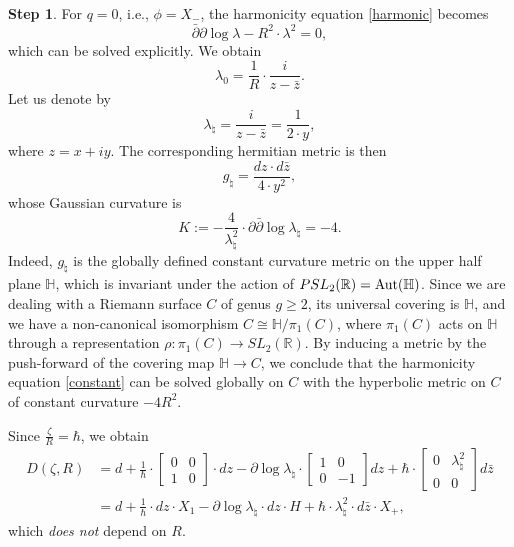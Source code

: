 \documentclass[oneside, 11pt]{amsart}
\theoremstyle{definition}
\newtheorem{step}{Step}
\numberwithin{equation}{subsection}
\def\Aut{{\text{\rm{Aut}}}}
\def\isom{\cong}
\def\lam{\lambda}
\newcommand{\be}{\begin{equation}}
\newcommand{\ee}{\end{equation}}
\newcommand{\bH}{{\mathbb{H}}}
\newcommand{\bR}{{\mathbb{R}}}
\newcommand{\lrar}{\longrightarrow}
\begin{document}
{\begin{step} For $q=0$, i.e., $\phi=X_{-}$,  the harmonicity equation \eqref{harmonic} becomes
\be\label{constant}
\bar{\partial}\partial\log \lam -R^2 \cdot \lambda^2 = 0,
\ee
which can be solved explicitly. We obtain
\be\label{lam 0}
\lam_0 = \frac{1}{R}\cdot \frac{i}{z-\bar{z}}.
\ee
Let us denote by 
\be\label{natural}
\lambda_\natural = \frac{i}{z-\bar{z}} = \frac{1}{2 \cdot y},
\ee
where $z= x+iy$.
The corresponding hermitian metric is then 
$$
g_\natural = \frac{dz\cdot d\bar{z}}{4\cdot y^2},
$$
whose Gaussian curvature is 
\be\label{curvature}
K := -\frac{4}{\lam_\natural^2} \cdot
\partial\bar{\partial}\log \lam_{\natural} = -4.
\ee
Indeed, $g_\natural$ is the globally defined
 constant curvature
metric on the upper half plane $\bH$, which is
invariant under the action of $PSL_2(\bR) = \Aut(\bH)$. 
Since we are dealing with a Riemann surface $C$
of genus $g\ge 2$, its universal covering is
$\bH$, and we have a non-canonical isomorphism
$C \isom \bH/\pi_1(C)$,
where $\pi_1(C)$ acts on $\bH$ through a 
representation $\rho:\pi_1(C)\lrar SL_2(\bR)$. 
By inducing a metric by the push-forward 
of the covering map $\bH\lrar C$, 
we conclude that the harmonicity equation
\eqref{constant} can be solved globally on $C$
with the hyperbolic metric on $C$ of
constant curvature $-4R^2$. 

Since $\frac{\zeta}{R}=\hbar$, we obtain
\be\label{q=0}
\begin{aligned}
D(\zeta, R)&=d+
\frac{1}{\hbar}\cdot \begin{bmatrix}
0 & 0\\
1& 0
\end{bmatrix}\cdot dz
-\partial \log \lambda_{\natural}\cdot \begin{bmatrix}
1 &0\\
0&-1
\end{bmatrix} dz+\hbar\cdot  \begin{bmatrix}
0 & \lambda_{\natural}^2\\
0& 0
\end{bmatrix} d\bar{z}
\\
&=
d+\frac{1}{\hbar}\cdot dz \cdot X_1-\partial \log \lambda_{\natural}\cdot dz \cdot H+
\hbar \cdot \lam_\natural^2 \cdot d\bar{z}\cdot X_+,
\end{aligned}
\ee
which \emph{does not} depend on $R$. 
\end{step}

}
\end{document}
